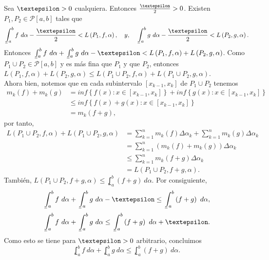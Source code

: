 Sea $\text{\textepsilon}>0$ cualquiera. Entonces $\frac{\text{\textepsilon}}{2}>0$. Existen $P_1,P_2\in\mathcal{P}\left[a,b\right]$ tales que
  \begin{equation*}
    \lowint_a^b f\ d\alpha - \frac{\text{\textepsilon}}{2} < L\left(P_1,f,\alpha\right),\quad y,\quad \lowint_a^b g\ d\alpha - \frac{\text{\textepsilon}}{2} < L\left(P_2,g,\alpha\right).
  \end{equation*}
  Entonces $\lowint_a^b f\ d\alpha + \lowint_a^b g\ d\alpha - \text{\textepsilon} < L\left(P_1,f,\alpha\right)+L\left(P_2,g,\alpha\right)$. Como $P_1\cup P_2 \in \mathcal{P}\left[a,b\right]$ y es más fina que $P_1$ y que $P_2$, entonces $L\left(P_1,f,\alpha\right)+L\left(P_2,g,\alpha\right) \leq L\left(P_1\cup P_2,f,\alpha\right)+L\left(P_1\cup P_2,g,\alpha\right)$.\\
  Ahora bien, notemos que en cada subintervalo $\left[x_{k-1},x_k\right]$ de $P_1\cup P_2$ tenemos
  \begin{align*}
    m_k\left(f\right)+m_k\left(g\right)&=inf\left\lbrace f\left(x\right): x\in\left[x_{k-1},x_k\right]\right\rbrace+inf\left\lbrace g\left(x\right): x\in\left[x_{k-1},x_k\right]\right\rbrace\\
    &\leq inf\left\lbrace f\left(x\right)+g\left(x\right): x\in\left[x_{k-1},x_k\right]\right\rbrace\\
    &=m_k\left(f+g\right),
  \end{align*}
por tanto,
\begin{align*}
  L\left(P_1\cup P_2, f, \alpha\right)+L\left(P_1\cup P_2, g, \alpha\right)&=\sum_{k=1}^{n} m_k\left(f\right)\Delta\alpha_k+\sum_{k=1}^{n} m_k\left(g\right)\Delta\alpha_k\\
  &=\sum_{k=1}^{n} \left(m_k\left(f\right)+m_k\left(g\right)\right)\Delta\alpha_k\\
  &\leq \sum_{k=1}^{n} m_k\left(f+g\right)\Delta\alpha_k\\
  &=L\left(P_1\cup P_2, f+g, \alpha\right).
\end{align*}
También, $L\left(P_1\cup P_2, f+g, \alpha\right)\leq \lowint_a^b\left(f+g\right)\ d\alpha$. Por consiguiente,
\begin{equation*}
\lowint_a^b f\ d\alpha + \lowint_a^b g\ d\alpha - \text{\textepsilon} \leq \lowint_a^b \left(f+g\right)\ d\alpha,
\end{equation*}
\begin{equation*}
\lowint_a^b f\ d\alpha + \lowint_a^b g\ d\alpha \leq \lowint_a^b \left(f+g\right)\ d\alpha +  \text{\textepsilon}.
\end{equation*}
Como esto se tiene para $\text{\textepsilon}>0$ arbitrario, concluimos
\begin{equation*}
\lowint_a^b f\ d\alpha + \lowint_a^b g\ d\alpha \leq \lowint_a^b \left(f+g\right)\ d\alpha.
\end{equation*}
